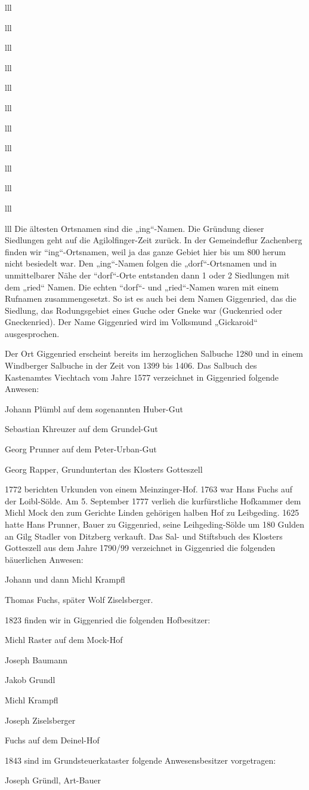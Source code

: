 \documentclass[12pt,a4pager]{book}
\begin{document}
\begin{tabuluar}{lll}
\begin{tabuluar}{lll}
\begin{tabuluar}{lll}
\begin{tabuluar}{lll}
\begin{tabuluar}{lll}
\begin{tabuluar}{lll}
\begin{tabuluar}{lll}
\begin{tabuluar}{lll}
\begin{tabuluar}{lll}
\begin{tabuluar}{lll}
\begin{tabuluar}{lll}
\begin{tabuluar}{lll}
Die ältesten Ortsnamen sind die „ing“-Namen. Die Gründung dieser Siedlungen geht
auf die Agilolfinger-Zeit zurück. In der Gemeindeflur Zachenberg finden wir
“ing“-Ortsnamen, weil ja das ganze Gebiet hier bis um 800 herum nicht besiedelt
war. Den „ing“-Namen folgen die „dorf“-Ortsnamen und in unmittelbarer Nähe der
“dorf“-Orte entstanden dann 1 oder 2 Siedlungen mit dem „ried“ Namen. Die echten
“dorf“- und „ried“-Namen waren mit einem Rufnamen zusammengesetzt. So ist es
auch bei dem Namen Giggenried, das die Siedlung, das Rodungsgebiet eines Guche
oder Gneke war (Guckenried oder Gneckenried). Der Name Giggenried wird im
Volksmund „Gickaroid“ ausgesprochen.

Der Ort Giggenried erscheint bereits im herzoglichen Salbuche 1280 und in einem
Windberger Salbuche in der Zeit von 1399 bis 1406. Das Salbuch des Kastenamtes
Viechtach vom Jahre 1577 verzeichnet in Giggenried folgende Anwesen:

Johann Plümbl auf dem sogenannten Huber-Gut

Sebastian Khreuzer auf dem Grundel-Gut

Georg Prunner auf dem Peter-Urban-Gut

Georg Rapper, Grunduntertan des Klosters Gotteszell

1772 berichten Urkunden von einem Meinzinger-Hof. 1763 war Hans Fuchs auf der
Loibl-Sölde. Am 5. September 1777 verlieh die kurfürstliche Hofkammer dem Michl
Mock den zum Gerichte Linden gehörigen halben Hof zu Leibgeding. 1625 hatte Hans
Prunner, Bauer zu Giggenried, seine Leihgeding-Sölde um 180 Gulden an Gilg
Stadler von Ditzberg verkauft. Das Sal- und Stiftsbuch des Klosters Gotteszell
aus dem Jahre 1790/99 verzeichnet in Giggenried die folgenden bäuerlichen
Anwesen:

Johann und dann Michl Krampfl

Thomas Fuchs, später Wolf Ziselsberger.

1823 finden wir in Giggenried die folgenden Hofbesitzer:

Michl Raster auf dem Mock-Hof

Joseph Baumann

Jakob Grundl

Michl Krampfl

Joseph Ziselsberger

Fuchs auf dem Deinel-Hof

1843 sind im Grundsteuerkataster folgende Anwesensbesitzer vorgetragen:

Joseph Gründl, Art-Bauer


\end{tabuluar}
\end{tabuluar}
\end{tabuluar}
\end{tabuluar}
\end{tabuluar}
\end{tabuluar}
\end{tabuluar}
\end{tabuluar}
\end{tabuluar}
\end{tabuluar}
\end{tabuluar}
\end{tabuluar}
\end{document}
